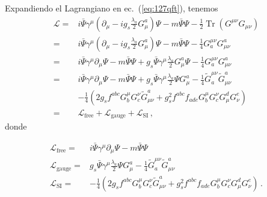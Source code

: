 \begin{frame}
Expandiendo el Lagrangiano en ec.~(\ref{eq:127qft}), tenemos
\begin{align}
  \mathcal{L}=&i\bar{\Psi}\gamma^\mu\left(\partial_\mu-i g_s\frac{\lambda_a}{2}G_\mu^a\right)\Psi
  -m\bar{\Psi}\Psi- \frac{1}{2}\operatorname{Tr}\left(G^{\mu\nu} G_{\mu\nu}\right)\nonumber\\
  =&i\bar{\Psi}\gamma^\mu\left(\partial_\mu-i g_s\frac{\lambda_a}{2}G_\mu^a\right)\Psi
  -m\bar{\Psi}\Psi- \frac{1}{4}G^{\mu\nu}_a G_{\mu\nu}^a\nonumber\\
=&i\bar{\Psi}\gamma^\mu\partial_\mu\Psi-m\bar{\Psi}\Psi+g_s\bar{\Psi}\gamma^\mu\frac{\lambda_a}{2}G_\mu^a\Psi
  - \frac{1}{4}G^{\mu\nu}_a G_{\mu\nu}^a\nonumber\\
=&i\bar{\Psi}\gamma^\mu\partial_\mu\Psi-m\bar{\Psi}\Psi+g_s\bar{\Psi}\gamma^\mu\frac{\lambda_a}{2}\Psi G_\mu^a
  - \frac{1}{4}\widetilde{G}^{\mu\nu}_a \widetilde{G}_{\mu\nu}^a\nonumber\\
  &- \frac{1}{4}\left(%
    2g_sf^{a b c}G_b^\mu G_c^\nu\widetilde{G}_{\mu\nu}^a
    +g_s^2f^{a b c}f_{a d e}G_b^\mu G_c^\nu G^d_\mu G^e_\nu\right)\nonumber\\
=&\mathcal{L}_{\text{free}}+\mathcal{L}_{\text{gauge}}+\mathcal{L}_{\text{SI}}\,,
\end{align}
donde

\begin{align}
\label{eq:qcdgauge}
\mathcal{L}_{\text{free}}=&i\bar{\Psi}\gamma^\mu\partial_\mu\Psi-m\bar{\Psi}\Psi\nonumber\\
  \mathcal{L}_{\text{gauge}}=&g_s\bar{\Psi}\gamma^\mu\frac{\lambda_a}{2}\Psi G_\mu^a
  - \frac{1}{4}\widetilde{G}^{\mu\nu}_a \widetilde{G}_{\mu\nu}^a\nonumber\\
  \mathcal{L}_{\text{SI}}=&- \frac{1}{4}\left(%
    2 g_sf^{a b c}G_b^\mu G_c^\nu\widetilde{G}_{\mu\nu}^a
    +g_s^2f^{a b c}f_{a d e}G_b^\mu G_c^\nu G^d_\mu G^e_\nu\right)\,.
\end{align}


\end{frame}
